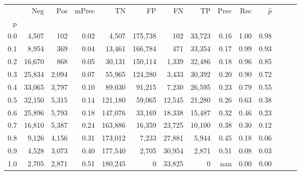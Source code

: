 \begin{tabular}{rrrrrrrrrrrrrr}
\toprule
{} &     Neg &    Pos & mPrec &       TN &       FP &      FN &      TP &  Prec &   Rec & $\hat{p}$ \\
p   &         &        &       &          &          &         &         &       &       &           \\
\midrule
0.0 &   4,507 &    102 &  0.02 &    4,507 &  175,738 &     102 &  33,723 &  0.16 &  1.00 &      0.98 \\
0.1 &   8,954 &    369 &  0.04 &   13,461 &  166,784 &     471 &  33,354 &  0.17 &  0.99 &      0.93 \\
0.2 &  16,670 &    868 &  0.05 &   30,131 &  150,114 &   1,339 &  32,486 &  0.18 &  0.96 &      0.85 \\
0.3 &  25,834 &  2,094 &  0.07 &   55,965 &  124,280 &   3,433 &  30,392 &  0.20 &  0.90 &      0.72 \\
0.4 &  33,065 &  3,797 &  0.10 &   89,030 &   91,215 &   7,230 &  26,595 &  0.23 &  0.79 &      0.55 \\
0.5 &  32,150 &  5,315 &  0.14 &  121,180 &   59,065 &  12,545 &  21,280 &  0.26 &  0.63 &      0.38 \\
0.6 &  25,896 &  5,793 &  0.18 &  147,076 &   33,169 &  18,338 &  15,487 &  0.32 &  0.46 &      0.23 \\
0.7 &  16,810 &  5,387 &  0.24 &  163,886 &   16,359 &  23,725 &  10,100 &  0.38 &  0.30 &      0.12 \\
0.8 &   9,126 &  4,156 &  0.31 &  173,012 &    7,233 &  27,881 &   5,944 &  0.45 &  0.18 &      0.06 \\
0.9 &   4,528 &  3,073 &  0.40 &  177,540 &    2,705 &  30,954 &   2,871 &  0.51 &  0.08 &      0.03 \\
1.0 &   2,705 &  2,871 &  0.51 &  180,245 &        0 &  33,825 &       0 &   nan &  0.00 &      0.00 \\
\bottomrule
\end{tabular}
